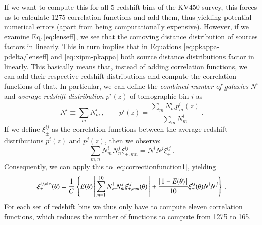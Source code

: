 If we want to compute this for all 5 redshift bins of the KV450-survey, this forces us to calculate 1275 correlation functions and add them, thus yielding potential numerical errors (apart from being computationally expensive). However, if we examine Eq.\,\eqref{eq:lenseff}, we see that the comoving distance distribution of sources factors in linearly. This in turn implies that in Equations \eqref{eq:pkappa-pdelta/lenseff} and \eqref{eq:xipm-pkappa} both source distance distributions factor in linearly. This basically means that, instead of adding correlation functions, we can add their respective redshift distributions and compute the correlation functions of that. In particular, we can define the \textit{combined number of galaxies} $N^i$ and \textit{average redshift distribution} $p^i(z)$ of tomographic bin $i$ as \[
N^i\equiv\sum_m N_m^i\, , \qquad p^i(z) = \frac{\sum_m N_m^i p_m^i(z)}{\sum_m N_m^i} \, .
\]
If we define $\xi^{ij}_\pm$ as the correlation functions between the average redshift distributions $p^i(z)$ and $p^j(z)$, then we observe: \[
\sum_{m,n}N_m^iN_n^j\xi^{ij}_{\pm,mn} = N^iN^j\xi^{ij}_\pm\, .
\]
Consequently, we can apply this to \eqref{eq:correctionfunction1}, yielding
\begin{equation}
\xi_{\pm}^{ij,\rm{obs}}(\theta) = \frac{1}{C}\left\{ E(\theta)\left[\sum_{m=1}^{10} N_m^iN_m^j \xi_{\pm,mm}^{ij}(\theta)\right] +\frac{\big[1-E(\theta)\big]}{10}\xi_\pm^{ij}(\theta)N^iN^j\right\}\, .
\label{eq:correctionfunction2}
\end{equation}
For each set of redshift bins we thus only have to compute eleven correlation functions, which reduces the number of functions to compute from 1275 to 165.
